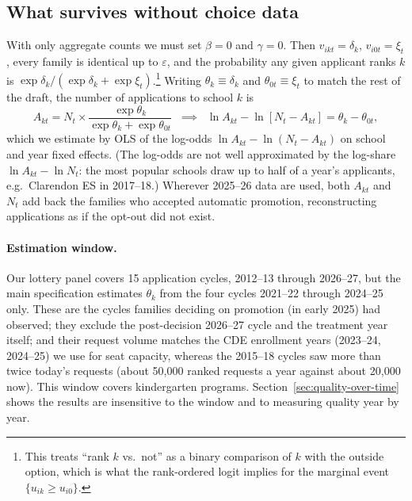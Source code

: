 \documentclass{article}
\begin{document}
\subsection{What survives without choice data}
\label{sec:individual-data}
With only aggregate counts we must set $\beta = 0$ and $\gamma = 0$. Then $v_{ikt} = \delta_k$, $v_{i0t} = \xi_t$, every family is identical up to $\varepsilon$, and the probability any given applicant ranks $k$ is $\exp\delta_k / (\exp\delta_k + \exp\xi_t)$.\footnote{This treats ``rank $k$ vs.\ not'' as a binary comparison of $k$ with the outside option, which is what the rank-ordered logit implies for the marginal event $\{u_{ik} \ge u_{i0}\}$.} Writing $\theta_k \equiv \delta_k$ and $\theta_{0t} \equiv \xi_t$ to match the rest of the draft, the number of applications to school $k$ is
\[
A_{kt} = N_t \times \frac{\exp \theta_k}{\exp\theta_k + \exp\theta_{0t}} \;\; \implies \;\; \ln A_{kt} - \ln\left[ N_t - A_{kt} \right] = \theta_k - \theta_{0t},
\]
which we estimate by OLS of the log-odds $\ln A_{kt} - \ln(N_t - A_{kt})$ on school and year fixed effects. (The log-odds are not well approximated by the log-share $\ln A_{kt} - \ln N_t$: the most popular schools draw up to half of a year's applicants, e.g.\ Clarendon ES in 2017--18.) Wherever 2025--26 data are used, both $A_{kt}$ and $N_t$ add back the families who accepted automatic promotion, reconstructing applications as if the opt-out did not exist.

\paragraph{Estimation window.} Our lottery panel covers 15 application cycles, 2012--13 through 2026--27, but the main specification estimates $\theta_k$ from the four cycles 2021--22 through 2024--25 only. These are the cycles families deciding on promotion (in early 2025) had observed; they exclude the post-decision 2026--27 cycle and the treatment year itself; and their request volume matches the CDE enrollment years (2023--24, 2024--25) we use for seat capacity, whereas the 2015--18 cycles saw more than twice today's requests (about 50{,}000 ranked requests a year against about 20{,}000 now). This window covers \numSchools{} kindergarten programs. Section~\ref{sec:quality-over-time} shows the results are insensitive to the window and to measuring quality year by year.
\end{document}
